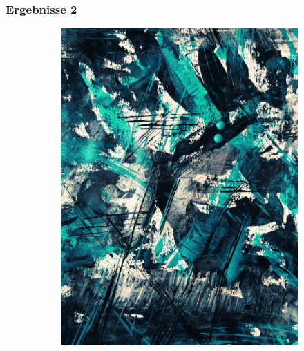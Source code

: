 \begin{frame}
    \frametitle{Ergebnisse 2}


    \begin{figure}[H]
        \centering
    
        \begin{subfigure}[h]{0.32\textwidth}
            \centering
            \quad
        \end{subfigure}
        \begin{subfigure}[h]{0.32\textwidth}
            \centering
            \includegraphics[width=\textwidth]{resources/content/style/teal_and_black_abstract_painting.jpg}
        \end{subfigure}
        \begin{subfigure}[h]{0.32\textwidth}
            \centering

\end{subfigure}
\end{figure}
\end{frame}

